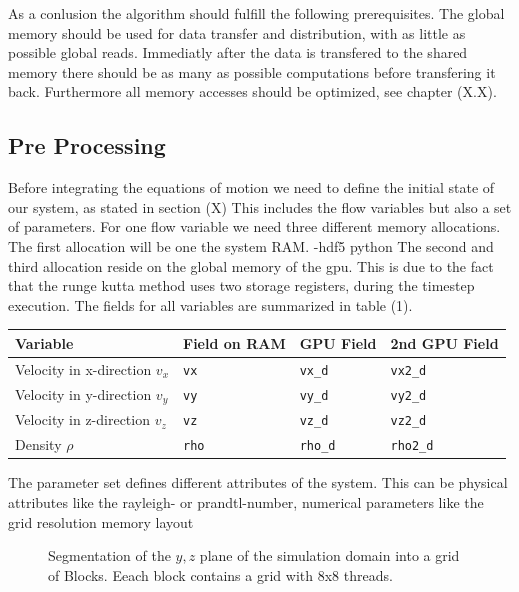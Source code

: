 As a conlusion the algorithm should fulfill the following prerequisites.
The global memory should be used for data transfer and distribution, with as little as possible global reads.
Immediatly after the data is transfered to the shared memory there should be as many as possible computations before transfering
it back. Furthermore all memory accesses should be optimized, see chapter (X.X).

\subsection{Pre Processing}

\label{cuda:prepro}
Before integrating the equations of motion we need to define the initial state of our system, as stated in section (X)
This includes the flow variables but also a set of parameters.
For one flow variable we need three different memory allocations.
The first allocation will be one the system RAM.
-hdf5 python
The second and third allocation reside on the global memory of the gpu.
This is due to the fact that the runge kutta method uses two storage registers, during the timestep execution.
The fields for all variables are summarized in table (1).

\begin{center}
    \begin{tabular}{ | l | l | l | l |}
    \hline
    Variable & Field on RAM & GPU Field & 2nd GPU Field \\
    \hline
    Velocity in x-direction $v_x$  & \texttt{vx}   &  \texttt{vx\_d}   & \texttt{vx2\_d}   \\
    Velocity in y-direction $v_y$  & \texttt{vy}   &  \texttt{vy\_d}   & \texttt{vy2\_d}   \\
    Velocity in z-direction $v_z$  & \texttt{vz}   &  \texttt{vz\_d}   & \texttt{vz2\_d}   \\
    Density  $\rho$  & \texttt{rho}  &  \texttt{rho\_d}  & \texttt{rho2\_d}  \\
    \hline
    \end{tabular}
\end{center}
The parameter set defines different attributes of the system.
This can be physical attributes like the rayleigh- or prandtl-number, numerical parameters like the grid resolution
memory layout

\clearpage


\begin{figure}[!bp]
      \centering
       \caption{Segmentation of the $y, z$ plane of the simulation domain into a grid of Blocks.
                 Eeach block contains a grid with 8x8 threads.}
       \label{cuda:grid_example}
\end{figure}

